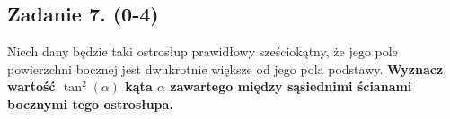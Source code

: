 \subsection*{Zadanie 7. (0-4)}
Niech dany będzie taki ostrosłup prawidłowy sześciokątny, że jego pole powierzchni bocznej jest dwukrotnie większe od jego pola podstawy. \textbf{Wyznacz wartość $\tan^{2}(\alpha)$ kąta $\alpha$ zawartego między sąsiednimi ścianami bocznymi tego ostrosłupa.}